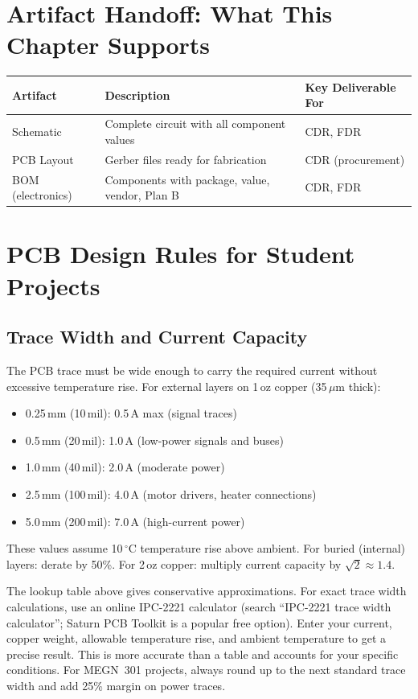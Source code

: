 \documentclass[11pt,letterpaper,twoside,openany]{book}
\newcommand{\degC}{\ensuremath{{}^{\circ}\text{C}}}
\begin{document}
\section{Artifact Handoff: What This Chapter Supports}
\begin{table}[htbp]\centering\small
\begin{tabularx}{\textwidth}{l X l}
\toprule
\textbf{Artifact} & \textbf{Description} & \textbf{Key Deliverable For} \\
\midrule
Schematic & Complete circuit with all component values & CDR, FDR \\
PCB Layout & Gerber files ready for fabrication & CDR (procurement) \\
BOM (electronics) & Components with package, value, vendor, Plan B & CDR, FDR \\
\bottomrule
\end{tabularx}
\end{table}

\section{PCB Design Rules for Student Projects}
\subsection{Trace Width and Current Capacity}
The PCB trace must be wide enough to carry the required current without excessive temperature rise. For external layers on 1\,oz copper (35\,$\mu$m thick):

\begin{itemize}[nosep,leftmargin=1.5em]
\item 0.25\,mm (10\,mil): 0.5\,A max (signal traces)
\item 0.5\,mm (20\,mil): 1.0\,A (low-power signals and buses)
\item 1.0\,mm (40\,mil): 2.0\,A (moderate power)
\item 2.5\,mm (100\,mil): 4.0\,A (motor drivers, heater connections)
\item 5.0\,mm (200\,mil): 7.0\,A (high-current power)
\end{itemize}

These values assume 10\,\degC{} temperature rise above ambient. For buried (internal) layers: derate by 50\%. For 2\,oz copper: multiply current capacity by $\sqrt{2} \approx 1.4$.

\begin{tipbox}
The lookup table above gives conservative approximations. For exact trace width calculations, use an online IPC-2221 calculator (search ``IPC-2221 trace width calculator''; Saturn PCB Toolkit is a popular free option). Enter your current, copper weight, allowable temperature rise, and ambient temperature to get a precise result. This is more accurate than a table and accounts for your specific conditions. For MEGN~301 projects, always round up to the next standard trace width and add 25\% margin on power traces.
\end{tipbox}
\end{document}
